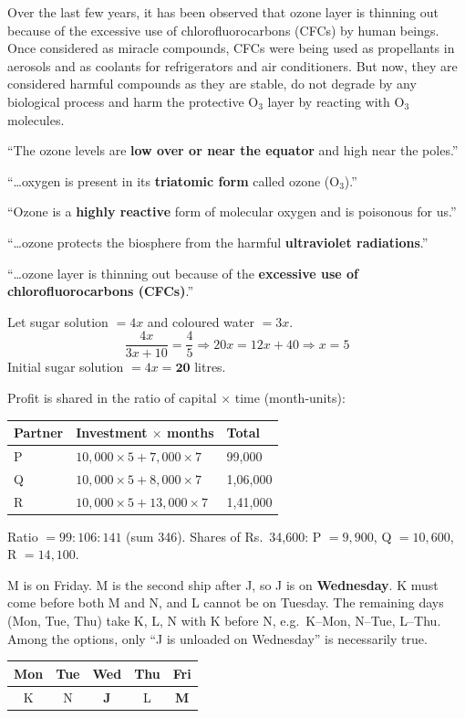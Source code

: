 Over the last few years, it has been observed that ozone layer is thinning out because of the excessive use of chlorofluorocarbons (CFCs) by human beings. Once considered as miracle compounds, CFCs were being used as propellants in aerosols and as coolants for refrigerators and air conditioners. But now, they are considered harmful compounds as they are stable, do not degrade by any biological process and harm the protective O$_3$ layer by reacting with O$_3$ molecules.

``The ozone levels are \textbf{low over or near the equator} and high near the poles.''

``\ldots oxygen is present in its \textbf{triatomic form} called ozone (O$_3$).''

``Ozone is a \textbf{highly reactive} form of molecular oxygen and is poisonous for us.''

``\ldots ozone protects the biosphere from the harmful \textbf{ultraviolet radiations}.''

``\ldots ozone layer is thinning out because of the \textbf{excessive use of chlorofluorocarbons (CFCs)}.''

Let sugar solution $=4x$ and coloured water $=3x$.
\[\frac{4x}{3x+10}=\frac45\Rightarrow20x=12x+40\Rightarrow x=5\]
Initial sugar solution $=4x=\mathbf{20}$ litres.

Profit is shared in the ratio of capital $\times$ time (month-units):
\begin{center}\small
\begin{tabular}{lll}\toprule
Partner & Investment $\times$ months & Total\\\midrule
P & $10{,}000\times5+7{,}000\times7$ & 99{,}000\\
Q & $10{,}000\times5+8{,}000\times7$ & 1{,}06{,}000\\
R & $10{,}000\times5+13{,}000\times7$ & 1{,}41{,}000\\\bottomrule
\end{tabular}
\end{center}
Ratio $=99:106:141$ (sum 346). Shares of Rs.~34{,}600: P $=9{,}900$, Q $=10{,}600$, R $=14{,}100$.

M is on Friday. M is the second ship after J, so J is on \textbf{Wednesday}. K must come before both M and N, and L cannot be on Tuesday. The remaining days (Mon, Tue, Thu) take K, L, N with K before N, e.g.\ K--Mon, N--Tue, L--Thu. Among the options, only ``J is unloaded on Wednesday'' is necessarily true.
\begin{center}\small
\begin{tabular}{ccccc}\toprule Mon & Tue & Wed & Thu & Fri\\\midrule K & N & \textbf{J} & L & \textbf{M}\\\bottomrule\end{tabular}
\end{center}

